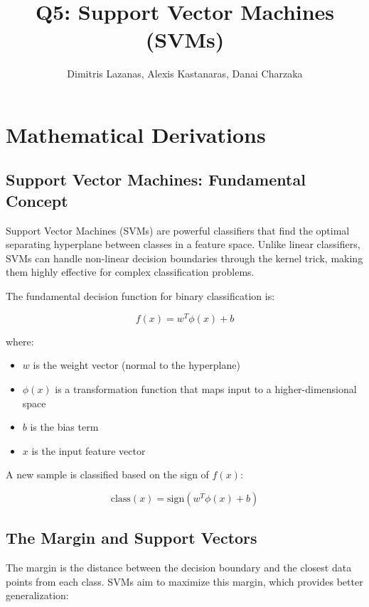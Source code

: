 \documentclass[12pt]{article}
\title{Q5:  Support Vector Machines (SVMs)}
\author{Dimitris Lazanas, Alexis Kastanaras, Danai Charzaka}
\date{}
\begin{document}
\maketitle

\section{Mathematical Derivations}

\subsection{Support Vector Machines: Fundamental Concept}

Support Vector Machines (SVMs) are powerful classifiers that find the optimal separating hyperplane between classes in a feature space. Unlike linear classifiers, SVMs can handle non-linear decision boundaries through the kernel trick, making them highly effective for complex classification problems.

The fundamental decision function for binary classification is:

\begin{equation}
f(x) = w^T \phi(x) + b
\end{equation}

where:
\begin{itemize}
    \item $w$ is the weight vector (normal to the hyperplane)
    \item $\phi(x)$ is a transformation function that maps input to a higher-dimensional space
    \item $b$ is the bias term
    \item $x$ is the input feature vector
\end{itemize}

A new sample is classified based on the sign of $f(x)$:

\begin{equation}
\text{class}(x) = \text{sign}(w^T \phi(x) + b)
\end{equation}

\subsection{The Margin and Support Vectors}

The margin is the distance between the decision boundary and the closest data points from each class. SVMs aim to maximize this margin, which provides better generalization:
\end{document}
